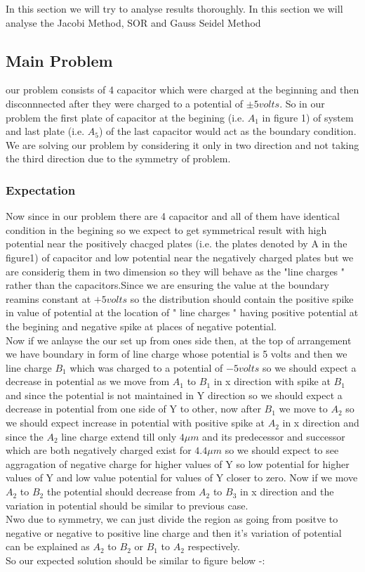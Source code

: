 In this section we will try to analyse  results thoroughly. In this section we will analyse the Jacobi Method, SOR  and Gauss Seidel Method  
\subsection{Main Problem}
our problem consists of 4 capacitor which were charged at the beginning and then disconnnected after they were charged  to a potential of $ \pm5 volts$. So in our problem the first plate of capacitor at the begining {(i.e. $A_{1}$ in figure 1) }of system and last plate {(i.e. $A_5$)} of the last capacitor  would act as the boundary condition. We are solving our problem by considering it only in two direction and not taking the third direction due to the symmetry of problem.
\subsubsection{Expectation}
Now since in our problem there are 4 capacitor and all of them have identical condition in the begining so we expect to get symmetrical result with high potential near the positively chacged plates (i.e. the plates denoted by A  in the figure1) of capacitor and low potential near the negatively charged plates but we are considerig them in two dimension so they will behave as the "line charges " rather than the capacitors.Since we are ensuring the value at the boundary reamins constant at $ +5 volts $ so the distribution should contain the positive spike in value of potential at the location of " line charges " having positive potential at the begining and negative spike at places of negative potential. \\
Now if we anlayse the our set up from ones side then, at the top of arrangement we have boundary in form of line charge whose potential is 5 volts and then we line charge $ B_1$ which was charged to a potential of $ -5 volts $ so we should expect a decrease in potential as we move from $ A_1 $ to $ B_1 $ in x direction with spike at $ B_1 $ and since the potential is not maintained in Y direction so we should expect a decrease in potential from one side of Y to other, now after $ B_1 $ we move to $ A_2 $ so we should expect increase in potential with positive spike at $ A_2 $ in x direction and since the $ A_2 $ line charge extend till only $ 4 \mu m $ and its predecessor and successor which are both negatively charged exist for $ 4.4 \mu m $ so we should expect to see aggragation of negative charge for higher values of Y so low potential for higher values of Y and low value potential for values of Y closer to zero. Now if we move $ A_2 $ to $ B_2 $ the potential should decrease from $ A_2 $ to $ B_3 $ in x direction and the variation in potential should be similar to previous case.\\
Nwo due to symmetry, we can just divide the region as going from positve to negative or negative to positive line charge and then it's variation of potential can be explained as $ A_2 $ to $ B_2 $ or $ B_1 $ to $ A_2 $ respectively.\\
So our expected solution should be similar to figure below -:\\

